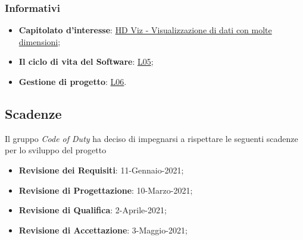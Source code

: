 	\subsubsection{Informativi}
		\begin{itemize}
			\item \textbf{Capitolato d'interesse}: \href{https://www.math.unipd.it/~tullio/IS-1/2020/Progetto/C4.pdf}{HD Viz - Visualizzazione di dati con molte dimensioni};
			\item \textbf{Il ciclo di vita del Software}: \href{https://www.math.unipd.it/~tullio/IS-1/2020/Dispense/L05.pdf}{L05};
			\item \textbf{Gestione di progetto}: \href{https://www.math.unipd.it/~tullio/IS-1/2020/Dispense/L06.pdf}{L06}.
		\end{itemize}
\subsection{Scadenze}
	Il gruppo \textit{Code of Duty} ha deciso di impegnarsi a rispettare le seguenti scadenze per lo sviluppo del progetto \hd
	\begin{itemize}
		\item \textbf{Revisione dei Requisiti}: 11-Gennaio-2021;
		\item \textbf{Revisione di Progettazione}: 10-Marzo-2021;
		\item \textbf{Revisione di Qualifica}: 2-Aprile-2021;
		\item \textbf{Revisione di Accettazione}: 3-Maggio-2021;
	\end{itemize}
